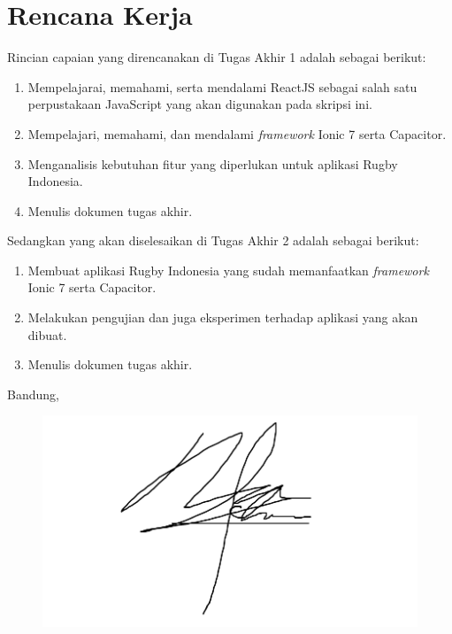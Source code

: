 \documentclass[a4paper,twoside]{article}
\begin{document}
\section{Rencana Kerja}
Rincian capaian yang direncanakan di Tugas Akhir 1 adalah sebagai berikut:
\begin{enumerate}
    \item Mempelajarai, memahami, serta mendalami ReactJS sebagai salah satu perpustakaan JavaScript yang akan digunakan pada skripsi ini.
    \item Mempelajari, memahami, dan mendalami \textit{framework} Ionic 7 serta Capacitor.
    \item Menganalisis kebutuhan fitur yang diperlukan untuk aplikasi Rugby Indonesia.
    \item Menulis dokumen tugas akhir.
\end{enumerate}

Sedangkan yang akan diselesaikan di Tugas Akhir 2 adalah sebagai berikut:
\begin{enumerate}
    \item Membuat aplikasi Rugby Indonesia yang sudah memanfaatkan \textit{framework} Ionic 7 serta Capacitor.
    \item Melakukan pengujian dan juga eksperimen terhadap aplikasi yang akan dibuat.
    \item Menulis dokumen tugas akhir.
\end{enumerate}

\vspace{1cm}
\centering Bandung, \tanggal\\
\begin{figure}[!h]
    \centering
    \includegraphics[scale=0.2]{Images/Tanda Tangan.png}
\end{figure}
\nama \\ 
\vspace{1cm}
\end{document}
